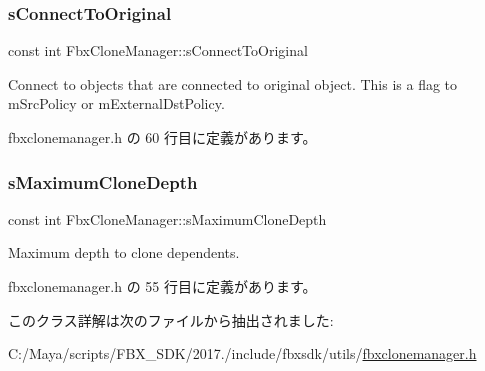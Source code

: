 \subsubsection{\texorpdfstring{s\+Connect\+To\+Original}{sConnectToOriginal}}
{\footnotesize\ttfamily const int Fbx\+Clone\+Manager\+::s\+Connect\+To\+Original\hspace{0.3cm}{\ttfamily [static]}}

Connect to objects that are connected to original object. This is a flag to m\+Src\+Policy or m\+External\+Dst\+Policy. 

 fbxclonemanager.\+h の 60 行目に定義があります。

\mbox{\label{class_fbx_clone_manager_a1844e81f1b96760b4223024b4c133da7}} 
\subsubsection{\texorpdfstring{s\+Maximum\+Clone\+Depth}{sMaximumCloneDepth}}
{\footnotesize\ttfamily const int Fbx\+Clone\+Manager\+::s\+Maximum\+Clone\+Depth\hspace{0.3cm}{\ttfamily [static]}}



Maximum depth to clone dependents. 



 fbxclonemanager.\+h の 55 行目に定義があります。



このクラス詳解は次のファイルから抽出されました\+:\begin{DoxyCompactItemize}
\item 
C\+:/\+Maya/scripts/\+F\+B\+X\+\_\+\+S\+D\+K/2017./include/fbxsdk/utils/\hyperlink{fbxclonemanager_8h}{fbxclonemanager.\+h}\end{DoxyCompactItemize}
